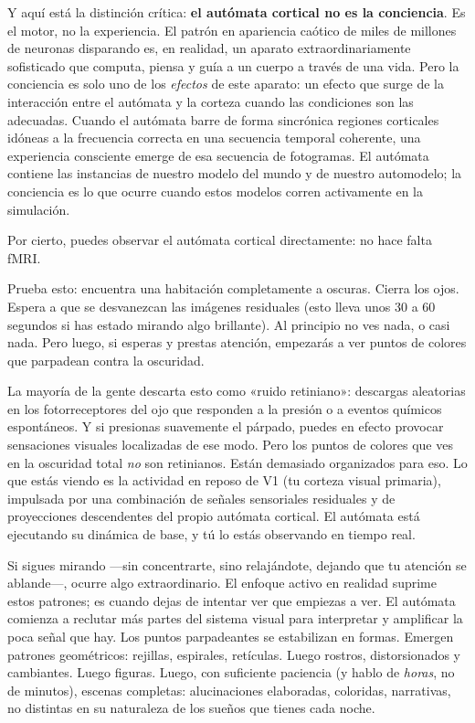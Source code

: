 \documentclass[11pt, twoside, openright]{book}
\begin{document}
Y aquí está la distinción crítica: \textbf{el autómata cortical no es la conciencia}. Es el motor, no la experiencia. El patrón en apariencia caótico de miles de millones de neuronas disparando es, en realidad, un aparato extraordinariamente sofisticado que computa, piensa y guía a un cuerpo a través de una vida. Pero la conciencia es solo uno de los \textit{efectos} de este aparato: un efecto que surge de la interacción entre el autómata y la corteza cuando las condiciones son las adecuadas. Cuando el autómata barre de forma sincrónica regiones corticales idóneas a la frecuencia correcta en una secuencia temporal coherente, una experiencia consciente emerge de esa secuencia de fotogramas. El autómata contiene las instancias de nuestro modelo del mundo y de nuestro automodelo; la conciencia es lo que ocurre cuando estos modelos corren activamente en la simulación.

Por cierto, puedes observar el autómata cortical directamente: no hace falta fMRI.

Prueba esto: encuentra una habitación completamente a oscuras. Cierra los ojos. Espera a que se desvanezcan las imágenes residuales (esto lleva unos 30 a 60 segundos si has estado mirando algo brillante). Al principio no ves nada, o casi nada. Pero luego, si esperas y prestas atención, empezarás a ver puntos de colores que parpadean contra la oscuridad.

La mayoría de la gente descarta esto como «ruido retiniano»: descargas aleatorias en los fotorreceptores del ojo que responden a la presión o a eventos químicos espontáneos. Y si presionas suavemente el párpado, puedes en efecto provocar sensaciones visuales localizadas de ese modo. Pero los puntos de colores que ves en la oscuridad total \textit{no} son retinianos. Están demasiado organizados para eso. Lo que estás viendo es la actividad en reposo de V1 (tu corteza visual primaria), impulsada por una combinación de señales sensoriales residuales y de proyecciones descendentes del propio autómata cortical. El autómata está ejecutando su dinámica de base, y tú lo estás observando en tiempo real.

Si sigues mirando ---sin concentrarte, sino relajándote, dejando que tu atención se ablande---, ocurre algo extraordinario. El enfoque activo en realidad suprime estos patrones; es cuando dejas de intentar ver que empiezas a ver. El autómata comienza a reclutar más partes del sistema visual para interpretar y amplificar la poca señal que hay. Los puntos parpadeantes se estabilizan en formas. Emergen patrones geométricos: rejillas, espirales, retículas. Luego rostros, distorsionados y cambiantes. Luego figuras. Luego, con suficiente paciencia (y hablo de \textit{horas}, no de minutos), escenas completas: alucinaciones elaboradas, coloridas, narrativas, no distintas en su naturaleza de los sueños que tienes cada noche.
\end{document}
